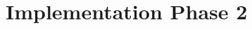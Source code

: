 \documentclass[english,oneside,color]{htldipl}
\begin{document}
\part{Implementation Phase 2}







\clearpage
{}

\printbibliography




\end{document}
